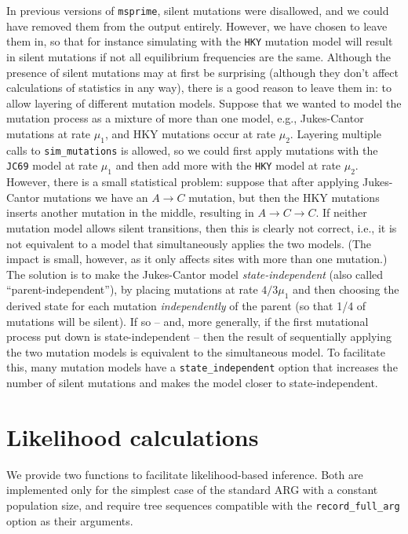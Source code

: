 \documentclass{article}
\newcommand{\msprime}[0]{\texttt{msprime}}
\begin{document}
In previous versions of \msprime, silent mutations were disallowed,
and we could have removed them from the output entirely.
However, we have chosen to leave them in, so that for instance
simulating with the \texttt{HKY} mutation model will result in silent mutations
if not all equilibrium frequencies are the same.
Although the presence of silent mutations may at first be surprising
(although they don't affect calculations of statistics in any way),
there is a good reason to leave them in:
to allow layering of different mutation models.
Suppose that we wanted to model the mutation process as a mixture of more than one model,
e.g., Jukes-Cantor mutations at rate $\mu_1$, and
HKY mutations occur at rate $\mu_2$.
Layering multiple calls to \texttt{sim\_mutations} is allowed,
so we could first apply mutations with the \texttt{JC69} model at rate $\mu_1$
and then add more with the \texttt{HKY} model at rate $\mu_2$.
However, there is a small statistical problem:
suppose that after applying Jukes-Cantor mutations we have an $A \to C$ mutation,
but then the HKY mutations inserts another mutation in the middle,
resulting in $A \to C \to C$.
If neither mutation model allows silent transitions,
then this is clearly not correct,
i.e., it is not equivalent to a model that simultaneously applies the two models.
(The impact is small, however, as it only affects sites with more than one mutation.)
The solution is to make the Jukes-Cantor model \emph{state-independent}
(also called ``parent-independent''),
by placing mutations at rate $4/3 \mu_1$ and then choosing the derived state for each mutation
\emph{independently} of the parent (so that 1/4 of mutations will be silent).
If so -- and, more generally, if the first mutational process put down is state-independent --
then the result of sequentially applying the two mutation models
is equivalent to the simultaneous model.
To facilitate this, many mutation models have a \texttt{state\_independent} option
that increases the number of silent mutations
and makes the model closer to state-independent.


\section*{Likelihood calculations}
\label{app-likelihoods}

We provide two functions to facilitate likelihood-based inference.
Both are implemented only for the simplest case of the standard ARG with a
constant population size, and require tree sequences compatible with the
\texttt{record\_full\_arg} option as their arguments.
\end{document}
